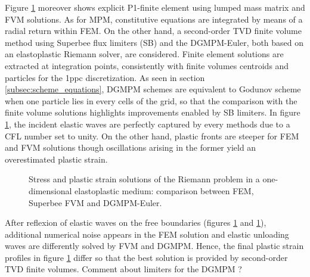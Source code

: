 Figure \ref{fig:RP_EP_dgmpm_fvm} moreover shows explicit P1-finite element using lumped mass matrix and FVM solutions. As for MPM, constitutive equations are integrated by means of a radial return within FEM. 
On the other hand, a second-order TVD finite volume method using Superbee flux limiters (SB) \cite{Thomas_EP} and the DGMPM-Euler, both based on an elastoplastic Riemann solver, are considered. 
Finite element solutions are extracted at integration points, consistently with finite volumes centroids and particles for the 1ppc discretization.
As seen in section \ref{subsec:scheme_equations}, DGMPM schemes are equivalent to Godunov scheme when one particle lies in every cells of the grid, so that the comparison with the finite volume solutions highlights improvements enabled by SB limiters. In figure \ref{fig:RP_EP_dgmpm_fvm}, the incident elastic waves are perfectly captured by every methods due to a CFL number set to unity. On the other hand, plastic fronts are steeper for FEM and FVM solutions though oscillations arising in the former yield an overestimated plastic strain. 
\begin{figure}[h!]
  \centering
  { \label{subfig:ep_dgmpm_fvm1}}
  { \label{subfig:ep_dgmpm_fvm2}}
  { \label{subfig:ep_dgmpm_fvm3}}
  {}
  \caption{Stress and plastic strain solutions of the Riemann problem in a one-dimensional elastoplastic medium: comparison between FEM, Superbee FVM and DGMPM-Euler.}
  \label{fig:RP_EP_dgmpm_fvm}
\end{figure}
After reflexion of elastic waves on the free boundaries (figures \ref{fig:RP_EP_dgmpm_fvm} and \ref{fig:RP_EP_dgmpm_fvm}), additional numerical noise appears in the FEM solution and elastic unloading waves are differently solved by FVM and DGMPM. Hence, the final plastic strain profiles in figure \ref{fig:RP_EP_dgmpm_fvm} differ so that the best solution is provided by second-order TVD finite volumes. Comment about limiters for the DGMPM ?

